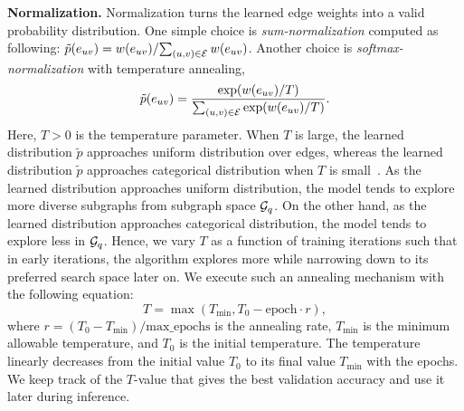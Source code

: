 \noindent\textbf{Normalization.} 
Normalization turns the learned edge weights into a valid probability distribution. One simple choice is \emph{sum-normalization} computed as following: $\tilde{p}(e_{uv}) = {w(e_{uv})}/{\sum_{(u,v)\in {\mathcal{E}}} w(e_{uv})}$.
Another choice is \emph{softmax-normalization} with temperature annealing,
\begin{equation}
\label{eq:softmaxnorm}
\tilde{p}(e_{uv}) = \frac{\exp(w(e_{uv})/T)}{\sum_{(u,v)\in {\mathcal{E}}} \exp(w(e_{uv})/T)}.
\end{equation}
Here, $T>0$ is the temperature parameter.
When $T$ is large, the learned distribution $\tilde{p}$ approaches uniform distribution over edges, whereas the learned distribution $\tilde{p}$ approaches categorical distribution when $T$ is small~\cite{jang2016categorical}. 
% 
As the learned distribution approaches uniform distribution, the model tends to explore more diverse subgraphs from subgraph space ${\mathcal{G}}_q$. On the other hand, as the learned distribution approaches categorical distribution, the model tends to explore less in ${\mathcal{G}}_q$.
Hence, we vary $T$ as a function of training iterations such that in early iterations, the algorithm explores more while narrowing down to its preferred search space later on. 
We execute such an annealing mechanism with the following equation:
\begin{equation}
T = \max (T_\mathrm{min},T_0 - \mathrm{epoch} \cdot r),
\end{equation}
% 
where $r = (T_0 - T_\mathrm{min})/{\mathrm{max\_epochs}}$ is the annealing rate, $T_\mathrm{min}$ is the minimum allowable temperature, and $T_0$ is the initial temperature. The temperature linearly decreases from the initial value $T_0$ to its final value $T_\mathrm{min}$ with the epochs. We keep track of the $T$-value that gives the best validation accuracy and use it later during inference.
 
